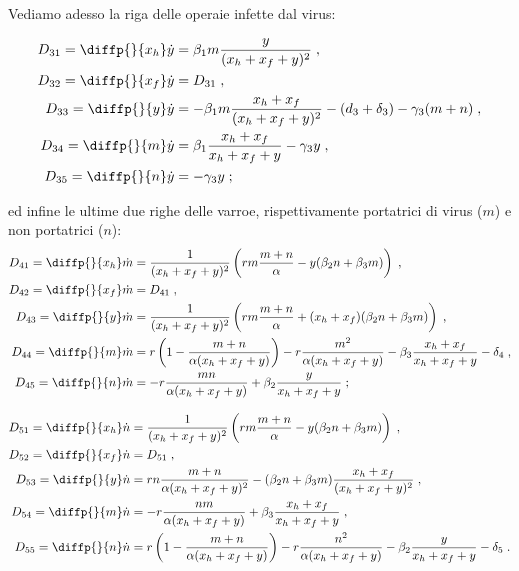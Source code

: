 Vediamo adesso la riga delle operaie infette dal virus:

\begin{equation} %
\begin{split}
D_{31} = \diffp{}{{x_h}} \dot{y} &= \beta_1 m \frac{y}{(x_h+x_f+y)^2} \; , \\
D_{32} = \diffp{}{{x_f}} \dot{y} &= D_{31} \; , \\
D_{33} = \diffp{}{y} \dot{y} &= - \beta_1 m \frac{x_h+x_f}{(x_h+x_f+y)^2} - (d_3 + \delta_3) - \gamma_3(m+n) \; , \\
D_{34} = \diffp{}{m} \dot{y} &= \beta_1 \frac{x_h+x_f}{x_h+x_f+y} - \gamma_3 y \; , \\
D_{35} = \diffp{}{n} \dot{y} &= -\gamma_3 y \; ;
\end{split}
\end{equation}

ed infine le ultime due righe delle varroe, rispettivamente portatrici di virus ($m$) e non portatrici ($n$):
\begin{equation}
\begin{split}
D_{41} = \diffp{}{{x_h}} \dot{m} &= \frac{1}{(x_h+x_f+y)^2} \left( r m \frac{m+n}{\alpha}
    - y ( \beta_2 n + \beta_3 m ) \right) \; , \\
D_{42} = \diffp{}{{x_f}} \dot{m} &= D_{41} \; , \\
D_{43} = \diffp{}{y} \dot{m} &= \frac{1}{(x_h+x_f+y)^2} \left( r m \frac{m+n}{\alpha}
    +(x_h+x_f) ( \beta_2 n + \beta_3 m ) \right) \; , \\
D_{44} = \diffp{}{m} \dot{m} &= r \left( 1 - \frac{m+n}{\alpha (x_h+x_f+y)} \right)
    - r \frac{m^2}{\alpha (x_h+x_f+y)} - \beta_3 \frac{x_h+x_f}{x_h+x_f+y} - \delta_4 \; , \\
D_{45} = \diffp{}{n} \dot{m} &= - r \frac{m n}{\alpha (x_h +x_f+y)} + \beta_2 \frac{y}{x_h+x_f+y} \; ;
\end{split}
\end{equation}

\begin{equation}
\begin{split}
D_{51} = \diffp{}{{x_h}} \dot{n} &= \frac{1}{(x_h+x_f+y)^2} \left( r m \frac{m+n}{\alpha}
    - y ( \beta_2 n + \beta_3 m ) \right) \; , \\
D_{52} = \diffp{}{{x_f}} \dot{n} &= D_{51} \; , \\
D_{53} = \diffp{}{y} \dot{n} &= r n \frac{m+n}{\alpha (x_h+x_f+y)^2}
    -(\beta_2 n + \beta_3 m) \frac{x_h+x_f}{(x_h+x_f+y)^2} \; , \\
D_{54} = \diffp{}{m} \dot{n} &= - r \frac{n m}{\alpha (x_h+x_f+y)} + \beta_3 \frac{x_h+x_f}{x_h+x_f+y} \;  , \\
D_{55} = \diffp{}{n} \dot{n} &= r \left( 1 - \frac{m+n}{\alpha (x_h+x_f+y)} \right)
    - r \frac{n^2}{\alpha (x_h+x_f+y)} - \beta_2 \frac{y}{x_h+x_f+y} - \delta_5 \; .
\end{split}
\end{equation}

